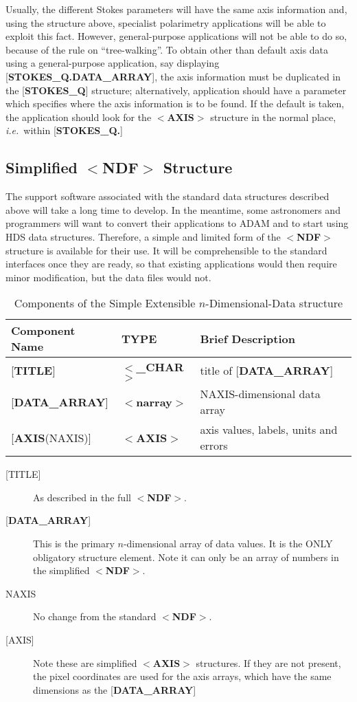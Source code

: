\documentclass[twoside,11pt]{article}
\newcommand{\xlabel}[1]{}
\begin{document}
Usually, the different Stokes parameters will
have the same axis information and,
using the structure above, specialist polarimetry applications will
be able to exploit this fact.  However, general-purpose applications will
not be able to do so,
because of the rule on ``tree-walking''.  To obtain
other than default
axis data using a general-purpose application, say displaying
{[}{\bf STOKES\_Q.DATA\_ARRAY}{]}, the axis information
must be duplicated in the
{[}{\bf STOKES\_Q}{]} structure; alternatively,
application should have
a parameter which
specifies where the axis information is to be found.
If the default is taken, the application should look
for the $<${\bf AXIS}$>$ structure in
the normal place, {\it i.e.}\  within {[}{\bf STOKES\_Q.}{]} 

\xlabel{se_sndf}\subsection{Simplified $<${\bf NDF}$>$ Structure\label{se:sndf}}

The support software associated with the
standard data structures described above
will take a long time to develop. In the meantime, some astronomers
and programmers will want to convert their applications to {\small ADAM} and
to start using HDS data structures.  Therefore, a simple and limited
form of the $<${\bf NDF}$>$ structure is available for their use.  It will be
comprehensible to the standard interfaces once they are ready, so
that existing
applications would then require minor modification, but the data files would
not.

\begin{table}[htb]
\centering
\caption{Components of the Simple Extensible $n$-Dimensional-Data structure}
\begin{tabular}{|l|l|l|}
\hline
Component Name & TYPE & Brief Description \\ \hline
{[}{\bf TITLE}{]} & $<${\bf \_CHAR}$>$ & title of {[}{\bf DATA\_ARRAY}{]} \\
{[}{\bf DATA\_ARRAY}{]} & $<${\bf narray}$>$ & NAXIS-dimensional data array \\
{[}{\bf AXIS}(NAXIS){]} & $<${\bf AXIS}$>$ & axis values, labels, units and errors \\ \hline
\end{tabular}
\end{table}

\begin{description}
\item [{[}TITLE{]}]  As described in the full $<${\bf NDF}$>$.
\item [{[}{\bf DATA\_ARRAY}{]}]  This is the primary
$n$-dimensional array of data values.
It is the ONLY obligatory structure element.  Note it can only be an array
of numbers in the simplified $<${\bf NDF}$>$.
\item [NAXIS]  No change from the standard $<${\bf NDF}$>$.
\item [{[}AXIS{]}] Note these are simplified $<${\bf AXIS}$>$ structures.
If they are not present, the pixel coordinates are used for the
axis arrays, which have the 
same dimensions as the {[}{\bf DATA\_ARRAY}{]}
\end{description}
\end{document}

